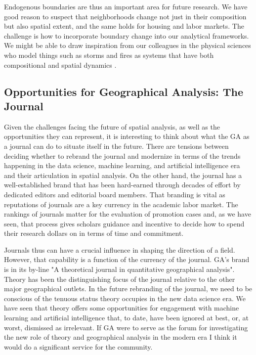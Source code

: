 \documentclass[11pt]{article}
\begin{document}
Endogenous boundaries are thus an important area for future research. We have
good reason to suspect that neighborhoods change not just in their composition
but also spatial extent, and the same holds for housing and labor markets. The
challenge is how to incorporate boundary change into our analytical frameworks.
We might be able to draw inspiration from our colleagues in the physical
sciences who model things such as storms and fires as systems that have both
compositional and spatial dynamics \cite{yuan2001representing}.

\subsection{Opportunities for Geographical Analysis: The Journal}
\label{sec:org01c95fd}


Given the challenges facing the future of spatial analysis, as well as the
opportunities they can represent, it is interesting to think about
what the GA as a journal can do to situate itself in the future. There are
tensions between deciding whether to rebrand the journal and modernize in terms
of the trends happening in the data science, machine learning, and artificial
intelligence era and their articulation in spatial analysis. On the other hand,
the journal has a well-established brand that has been hard-earned through 
decades of effort by dedicated editors and editorial board members. That
branding is vital as reputations of journals are a key currency in the
academic labor market. The rankings of journals matter for the evaluation of
promotion cases and, as we have seen, that process gives scholars guidance and
incentive to decide how to spend their research dollars on in terms of time and
commitment.

Journals thus can have a crucial influence in shaping the direction of a field.
However, that capability is a function of the currency of the journal. GA's
brand is in its by-line "A theoretical journal in quantitative geographical
analysis". Theory has been the distinguishing focus of the journal relative to
the other major geographical outlets. In the future rebranding of the journal, we
need to be conscious of the tenuous status theory occupies in the new data science
era. We have seen that theory offers some opportunities for engagement with
machine learning and artificial intelligence that, to date, have been ignored at
best, or, at worst, dismissed as irrelevant. If GA were to serve as the forum
for investigating the new role of theory and geographical analysis in the modern
era I think it would do a significant service for the community.
\end{document}
